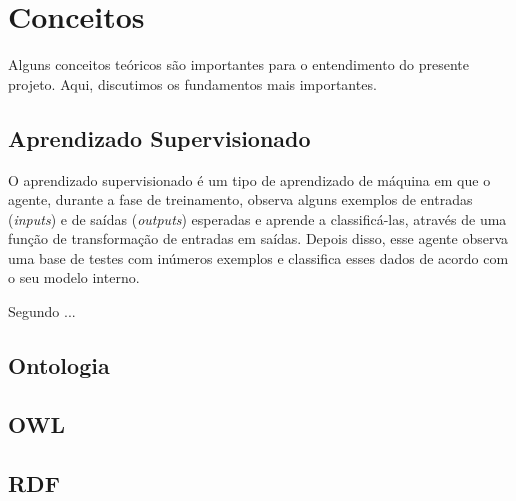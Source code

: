 \chapter{Conceitos}
\label{cap:conceitos}

Alguns conceitos teóricos são importantes para o entendimento do presente projeto. Aqui, discutimos os fundamentos mais importantes.

\section{Aprendizado Supervisionado}
\label{sec:fundamentos}

O aprendizado supervisionado é um tipo de aprendizado de máquina em que o agente, durante a fase de treinamento, observa alguns exemplos de entradas (\textit{inputs}) e de saídas (\textit{outputs}) esperadas e aprende a classificá-las, através de uma função de transformação de entradas em saídas. Depois disso, esse agente observa uma base de testes com inúmeros exemplos e classifica esses dados de acordo com o seu modelo interno.



Segundo \citet{AIMA}...





\section{Ontologia}
\label{sec:ontologia}


\section{OWL}
\label{sec:owl}


\section{RDF}
\label{sec:rdf}
